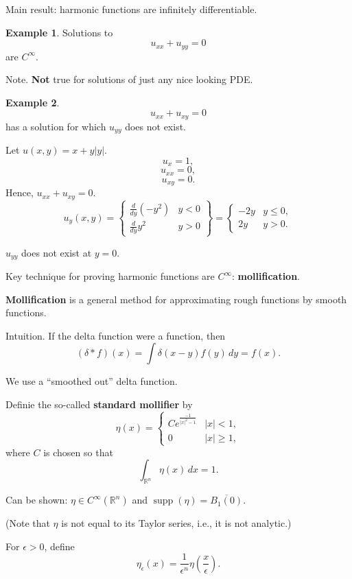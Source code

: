 \documentclass[12pt]{article}
\DeclareMathOperator{\supp}{supp}
\theoremstyle{definition}
\newtheorem*{example*}{Example}
\begin{document}
\subsubsection*{}
Main result: harmonic functions are infinitely differentiable.

\begin{example*}
Solutions to
\[u_{xx}+u_{yy}=0\]
are $C^{\infty}$.

Note. \textbf{Not} true for solutions of just any nice looking PDE.
\end{example*}

\begin{example*}
\[u_{xx}+u_{xy}=0\]
has a solution for which $u_{yy}$ does not exist.

Let $u(x,y)=x+y|y|$.
\[u_x=1,\]
\[u_{xx}=0,\]
\[u_{xy}=0.\]
Hence, $u_{xx}+u_{xy}=0$.
\[u_y(x,y)=\left\{\begin{array}{cc}\frac{d}{dy}(-y^2)&y<0\\\frac{d}{dy}y^2&y>0\end{array}\right\}=\left\{\begin{array}{cc}-2y&y\leq0,\\2y&y>0.\end{array}\right.\]

$u_{yy}$ does not exist at $y=0$.
\end{example*}

Key technique for proving harmonic functions are $C^{\infty}$: \textbf{mollification}.

\textbf{Mollification} is a general method for approximating rough functions by smooth functions.

Intuition. If the delta function were a function, then
\[(\delta*f)(x)=\int\delta(x-y)f(y)\,dy=f(x).\]

We use a ``smoothed out'' delta function.

Definie the so-called \textbf{standard mollifier} by
\[\eta(x)=\left\{\begin{array}{cc}Ce^{\frac{-1}{|x|^2-1}}&|x|<1,\\0&|x|\geq1,\end{array}\right.\]
where $C$ is chosen so that
\[\int_{\mathbb{R}^n}\eta(x)\,dx=1.\]

Can be shown: $\eta\in C^{\infty}(\mathbb{R}^n)$ and $\supp(\eta)=\overline{B_1(0)}$.

(Note that $\eta$ is not equal to its Taylor series, i.e., it is not analytic.)

For $\epsilon>0$, define
\[\eta_{\epsilon}(x)=\frac{1}{\epsilon^n}\eta\left(\frac{x}{\epsilon}\right).\]
\end{document}
